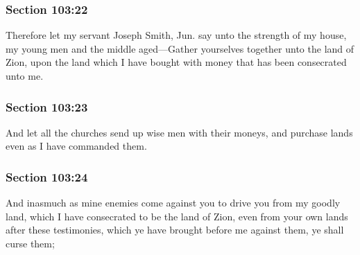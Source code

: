 	\subsubsection{Section 103:22} %
		\label{DC103-22}

		Therefore let my servant Joseph Smith, Jun. say unto the strength of my house, my young men and the middle aged---Gather yourselves together unto the land of Zion, upon the land which I have bought with money that has been consecrated unto me.


	\subsubsection{Section 103:23} %
		\label{DC103-23}

		And let all the churches send up wise men with their moneys, and purchase lands even as I have commanded them.


	\subsubsection{Section 103:24} %
		\label{DC103-24}

		And inasmuch as mine enemies come against you to drive you from my goodly land, which I have consecrated to be the land of Zion, even from your own lands after these testimonies, which ye have brought before me against them, ye shall curse them;



